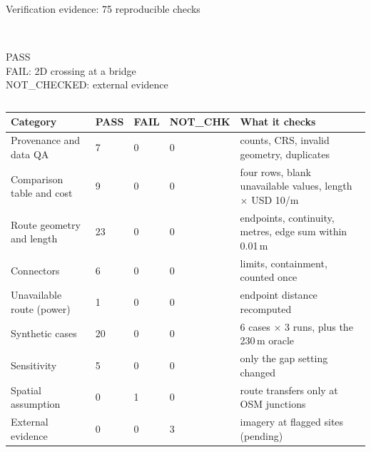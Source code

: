 \documentclass[aspectratio=169,11pt]{beamer}
\begin{document}
\begin{frame}{Verification evidence: 75 reproducible checks}
\small
\begin{columns}[T,onlytextwidth]
\\PASS
{}\\FAIL: 2D crossing at a bridge
\\NOT\_CHECKED: external evidence
\end{columns}
\vspace{2pt}
\scriptsize
\begin{tabularx}{\textwidth}{@{}l R{0.9cm} R{0.9cm} R{1.5cm} Y@{}}
\toprule
Category & PASS & FAIL & NOT\_CHK & What it checks\\
\midrule
Provenance and data QA & 7 & 0 & 0 & counts, CRS, invalid geometry, duplicates\\
Comparison table and cost & 9 & 0 & 0 & four rows, blank unavailable values, length $\times$ USD 10/m\\
Route geometry and length & 23 & 0 & 0 & endpoints, continuity, metres, edge sum within 0.01\,m\\
Connectors & 6 & 0 & 0 & limits, containment, counted once\\
Unavailable route (power) & 1 & 0 & 0 & endpoint distance recomputed\\
Synthetic cases & 20 & 0 & 0 & 6 cases $\times$ 3 runs, plus the 230\,m oracle\\
Sensitivity & 5 & 0 & 0 & only the gap setting changed\\
Spatial assumption & 0 & \textcolor{failred}{1} & 0 & route transfers only at OSM junctions\\
External evidence & 0 & 0 & \textcolor{amber}{3} & imagery at flagged sites (pending)\\
\bottomrule
\end{tabularx}
\end{frame}
\end{document}
